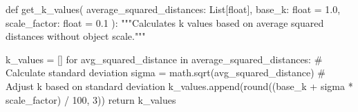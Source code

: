\startPY
def get_k_values(
  average_squared_distances: List[float],
  base_k: float = 1.0,
  scale_factor: float = 0.1
  ):
  """Calculates k values based on average squared distances without object scale."""

  k_values = []
  for avg_squared_distance in average_squared_distances:
    # Calculate standard deviation
    sigma = math.sqrt(avg_squared_distance)
    # Adjust k based on standard deviation
    k_values.append(round((base_k + sigma * scale_factor) / 100, 3))
  return k_values
\stopPY
\stopbuffer
